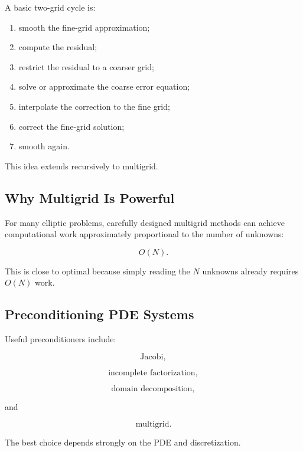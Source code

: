 A basic two-grid cycle is:

\begin{enumerate}
    \item smooth the fine-grid approximation;
    \item compute the residual;
    \item restrict the residual to a coarser grid;
    \item solve or approximate the coarse error equation;
    \item interpolate the correction to the fine grid;
    \item correct the fine-grid solution;
    \item smooth again.
\end{enumerate}

This idea extends recursively to multigrid.

\subsection{Why Multigrid Is Powerful}
\label{subsec:why-multigrid}

For many elliptic problems, carefully designed multigrid methods can achieve
computational work approximately proportional to the number of unknowns:

\[
\boxed{
O(N).
}
\]

This is close to optimal because simply reading the \(N\) unknowns already
requires \(O(N)\) work.

\subsection{Preconditioning PDE Systems}
\label{subsec:pde-preconditioning}

Useful preconditioners include:

\[
\boxed{
\text{Jacobi},
}
\]

\[
\boxed{
\text{incomplete factorization},
}
\]

\[
\boxed{
\text{domain decomposition},
}
\]

and

\[
\boxed{
\text{multigrid}.
}
\]

The best choice depends strongly on the PDE and discretization.

